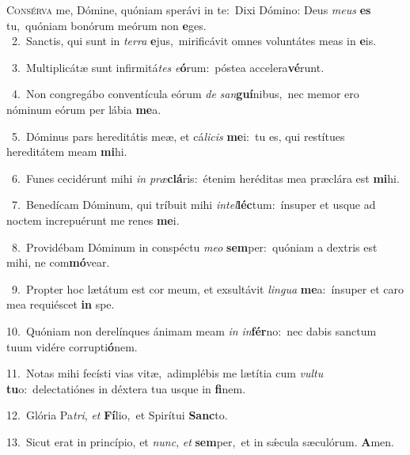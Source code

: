 \lettrine{\initial\textcolor{\initialcolor}{C}}{onsérva} me, Dómine, quóniam sperávi in te:~\dagger Dixi Dómino: Deus \textit{me}\-\textit{us} \textbf{es} tu,~\star quóniam bonórum meórum non \textbf{e}\-ges.\\
{\numbfont\textcolor{\numbcolor}{~2.}}~Sanctis, qui sunt in \textit{ter}\-\textit{ra} \textbf{e}\-jus,~\star mirificávit omnes voluntátes meas in \textbf{e}\-is.\par
{\numbfont\textcolor{\numbcolor}{~3.}}~Multiplicátæ sunt infirmitá\textit{tes} \textit{e}\-\textbf{ó}rum:~\star póstea accelera\-\textbf{vé}\-runt.\par
{\numbfont\textcolor{\numbcolor}{~4.}}~Non congregábo conventícula eórum \textit{de} \textit{san}\-\textbf{guí}nibus,~\star nec memor ero nóminum eórum per lábia \textbf{me}\-a.\par
{\numbfont\textcolor{\numbcolor}{~5.}}~Dóminus pars hereditátis meæ, et cá\-\textit{li}\-\textit{cis} \textbf{me}\-i:~\star tu es, qui restítues hereditátem meam \textbf{mi}\-hi.\par
{\numbfont\textcolor{\numbcolor}{~6.}}~Funes cecidérunt mihi \textit{in} \textit{præ}\-\textbf{clá}ris:~\star étenim heréditas mea præclára est \textbf{mi}\-hi.\par
{\numbfont\textcolor{\numbcolor}{~7.}}~Benedícam Dóminum, qui tríbuit mihi \textit{in}\-\textit{tel}\textbf{léc}tum:~\star ínsuper et usque ad noctem increpuérunt me renes \textbf{me}\-i.\par
{\numbfont\textcolor{\numbcolor}{~8.}}~Providébam Dóminum in conspéctu \textit{me}\-\textit{o} \textbf{sem}\-per:~\star quóniam a dextris est mihi, ne com\-\textbf{mó}\-vear.\par
{\numbfont\textcolor{\numbcolor}{~9.}}~Propter hoc lætátum est cor meum, et exsultávit \textit{lin}\-\textit{gua} \textbf{me}\-a:~\star ínsuper et caro mea requiéscet \textbf{in} spe.\par
{\numbfont\textcolor{\numbcolor}{10.}}~Quóniam non derelínques ánimam meam \textit{in} \textit{in}\-\textbf{fér}no:~\star nec dabis sanctum tuum vidére corrupti\-\textbf{ó}\-nem.\par
{\numbfont\textcolor{\numbcolor}{11.}}~Notas mihi fecísti vias vitæ,~\dagger adimplébis me lætítia cum \textit{vul}\-\textit{tu} \textbf{tu}\-o:~\star delectatiónes in déxtera tua usque in \textbf{fi}\-nem.\par
{\numbfont\textcolor{\numbcolor}{12.}}~Glória Pa\-\textit{tri}\-, \textit{et} \textbf{Fí}\-lio,~\star et Spirítui \textbf{Sanc}\-to.\par
{\numbfont\textcolor{\numbcolor}{13.}}~Sicut erat in princípio, et \textit{nunc}\-, \textit{et} \textbf{sem}\-per,~\star et in sǽcula sæculórum. \textbf{A}\-men.\par
